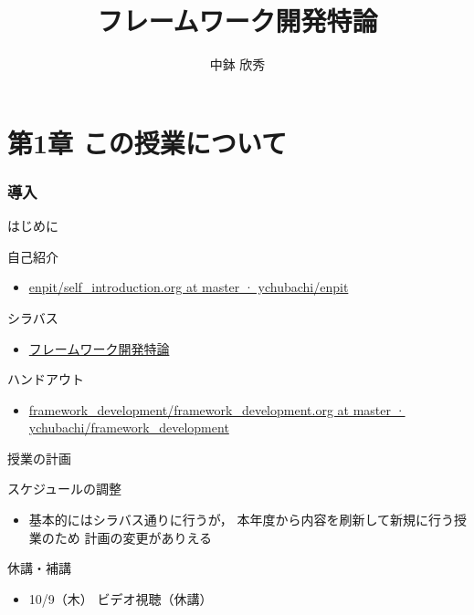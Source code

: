 \documentclass[t, aspectratio=169]{beamer}
\date{\insertpart}
\institute[AIIT]{産業技術大学院大学(AIIT)}
\author{中鉢 欣秀}
\date{}
\title{フレームワーク開発特論}
\begin{document}
\maketitle

\part{第1章 この授業について}
\label{sec-1}
\section{導入}
\label{sec-1-1}
\begin{frame}[label=sec-1-1-1]{はじめに}
\begin{block}{自己紹介}
\begin{itemize}
\item \href{https://github.com/ychubachi/enpit/blob/master/slides/self_introduction.org}{enpit/self\_introduction.org at master · ychubachi/enpit}
\end{itemize}
\end{block}
\begin{block}{シラバス}
\begin{itemize}
\item \href{http://aiit.ac.jp/master_program/isa/lecture/pdf/h26/4_6.pdf}{フレームワーク開発特論}
\end{itemize}
\end{block}
\begin{block}{ハンドアウト}
\begin{itemize}
\item \href{https://github.com/ychubachi/framework_development/blob/master/slides/framework_development.org}{framework\_development/framework\_development.org at master · ychubachi/framework\_development}
\end{itemize}
\end{block}
\end{frame}
\begin{frame}[label=sec-1-1-2]{授業の計画}
\begin{block}{スケジュールの調整}
\begin{itemize}
\item 基本的にはシラバス通りに行うが，
本年度から内容を刷新して新規に行う授業のため
計画の変更がありえる
\end{itemize}
\end{block}
\begin{block}{休講・補講}
\begin{itemize}
\item 10/9（木） ビデオ視聴（休講）
\end{itemize}
\end{block}
\end{frame}
\end{document}
